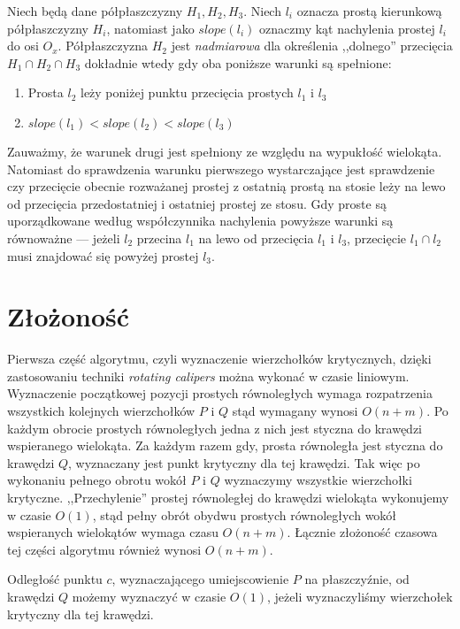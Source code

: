 \begin{lemat}
  Niech będą dane półpłaszczyzny $H_1, H_2, H_3$. Niech $l_i$ oznacza
  prostą kierunkową półpłaszczyzny $H_i$, natomiast jako $slope(l_i)$
  oznaczmy kąt nachylenia prostej $l_i$ do osi $O_x$. Półpłaszczyzna
  $H_2$ jest \emph{nadmiarowa} dla określenia ,,dolnego'' przecięcia
  $H_1 \cap H_2 \cap H_3$ dokładnie wtedy gdy oba poniższe warunki są
  spełnione:

  \begin{enumerate}
    \item Prosta $l_2$ leży poniżej punktu przecięcia prostych $l_1$ i
      $l_3$
    \item $slope(l_1) < slope(l_2) < slope(l_3)$
  \end{enumerate}
\end{lemat}

Zauważmy, że warunek drugi jest spełniony ze względu na wypukłość
wielokąta. Natomiast do sprawdzenia warunku pierwszego wystarczające
jest sprawdzenie czy przecięcie obecnie rozważanej prostej z ostatnią
prostą na stosie leży na lewo od przecięcia przedostatniej i ostatniej
prostej ze stosu. Gdy proste są uporządkowane według współczynnika
nachylenia powyższe warunki są równoważne --- jeżeli $l_2$ przecina
$l_1$ na lewo od przecięcia $l_1$ i $l_3$, przecięcie $l_1 \cap l_2$
musi znajdować się powyżej prostej $l_3$.

\section{Złożoność}
Pierwsza część algorytmu, czyli wyznaczenie wierzchołków krytycznych,
dzięki zastosowaniu techniki \emph{rotating calipers} można wykonać w
czasie liniowym. Wyznaczenie początkowej pozycji prostych równoległych
wymaga rozpatrzenia wszystkich kolejnych wierzchołków $P$ i $Q$ stąd
wymagany wynosi $O(n + m)$. Po każdym obrocie prostych równoległych
jedna z nich jest styczna do krawędzi wspieranego wielokąta. Za każdym
razem gdy, prosta równoległa jest styczna do krawędzi $Q$, wyznaczany
jest punkt krytyczny dla tej krawędzi. Tak więc po wykonaniu pełnego
obrotu wokół $P$ i $Q$ wyznaczymy wszystkie wierzchołki
krytyczne. ,,Przechylenie'' prostej równoległej do krawędzi wielokąta
wykonujemy w czasie $O(1)$, stąd pełny obrót obydwu prostych
równoległych wokół wspieranych wielokątów wymaga czasu $O(n + m)$.
Łącznie złożoność czasowa tej części algorytmu również wynosi $O(n +
m)$.

Odległość punktu $c$, wyznaczającego umiejscowienie $P$ na
płaszczyźnie, od krawędzi $Q$ możemy wyznaczyć w czasie $O(1)$, jeżeli
wyznaczyliśmy wierzchołek krytyczny dla tej krawędzi.

